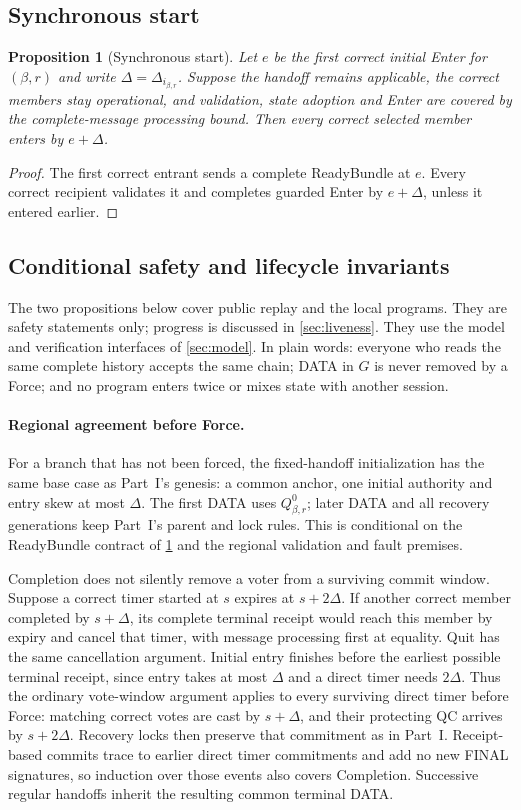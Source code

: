 \documentclass[11pt,a4paper]{article}
\newtheorem{proposition}[proposition]{Proposition}
\begin{document}
\subsection{Synchronous start}
\begin{proposition}[Synchronous start]
\label{prop:sync-start}
Let $e$ be the first correct initial Enter for $(\beta,r)$ and write
$\Delta=\Delta_{i_{\beta,r}}$. Suppose the handoff remains applicable,
the correct members stay operational, and validation, state adoption
and Enter are covered by the complete-message processing bound.
Then every correct selected member enters by $e+\Delta$.
\end{proposition}
\begin{proof}
The first correct entrant sends a complete ReadyBundle at $e$.
Every correct recipient validates it and completes guarded Enter by
$e+\Delta$, unless it entered earlier.
\end{proof}

\subsection{Conditional safety and lifecycle invariants}
\label{sec:safety-argument}
The two propositions below cover public replay and the local programs.
They are safety statements only; progress is discussed in
\cref{sec:liveness}. They use the model and verification interfaces of
\cref{sec:model}. In plain words: everyone who reads the same complete
history accepts the same chain; DATA in $G$ is never removed by a Force;
and no program enters twice or mixes state with another session.

\paragraph{Regional agreement before Force.}
For a branch that has not been forced, the fixed-handoff initialization
has the same base case as Part~I's genesis: a common anchor, one
initial authority and entry skew at most $\Delta$. The first DATA uses
$Q^0_{\beta,r}$; later DATA and all recovery generations keep Part~I's
parent and lock rules. This is conditional on the ReadyBundle contract
of \cref{prop:sync-start} and the regional validation and fault premises.

Completion does not silently remove a voter from a surviving commit
window. Suppose a correct timer started at $s$ expires at $s+2\Delta$.
If another correct member completed by $s+\Delta$, its complete terminal
receipt would reach this member by expiry and cancel that timer, with
message processing first at equality. Quit has the same cancellation
argument. Initial entry finishes before the earliest possible terminal
receipt, since entry takes at most $\Delta$ and a direct timer needs
$2\Delta$. Thus the ordinary vote-window argument applies to every
surviving direct timer before Force: matching correct votes are cast by
$s+\Delta$, and their protecting QC arrives by $s+2\Delta$. Recovery
locks then preserve that commitment as in Part~I. Receipt-based commits
trace to earlier direct timer commitments and add no new FINAL
signatures, so induction over those events also covers Completion.
Successive regular handoffs inherit the resulting common terminal DATA.
\end{document}

